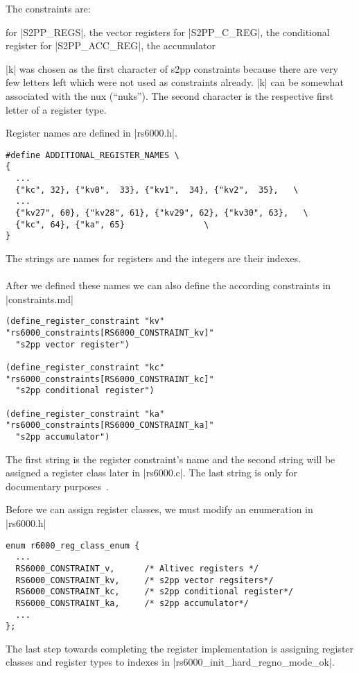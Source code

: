 The constraints are:
\begin{description}
         for |S2PP_REGS|, the vector registers
         for |S2PP_C_REG|, the conditional register
         for |S2PP_ACC_REG|, the accumulator
\end{description}

|k| was chosen as the first character of s2pp constraints because there are very few letters left which were not used as constraints already.
|k| can be somewhat associated with the nux (``nuks'').
The second character is the respective first letter of a register type.

Register names are defined in |rs6000.h|.
\begin{lstlisting}
#define ADDITIONAL_REGISTER_NAMES \
{
  ...
  {"kc", 32}, {"kv0",  33}, {"kv1",  34}, {"kv2",  35},   \
  ...
  {"kv27", 60}, {"kv28", 61}, {"kv29", 62}, {"kv30", 63},   \
  {"kc", 64}, {"ka", 65}                \
}
\end{lstlisting}
The strings are names for registers and the integers are their indexes.
\\
\\
After we defined these names we can also define the according constraints in |constraints.md|
\begin{lstlisting}
(define_register_constraint "kv" "rs6000_constraints[RS6000_CONSTRAINT_kv]"
  "s2pp vector register")

(define_register_constraint "kc" "rs6000_constraints[RS6000_CONSTRAINT_kc]"
  "s2pp conditional register")

(define_register_constraint "ka" "rs6000_constraints[RS6000_CONSTRAINT_ka]"
  "s2pp accumulator")
\end{lstlisting}

The first string is the register constraint's name and the second string will be assigned a register class later in |rs6000.c|.
The last string is only for documentary purposes~\citep[ch.~16.8]{GCCint}.

Before we can assign register classes, we must modify an enumeration in |rs6000.h|
\begin{lstlisting}
enum r6000_reg_class_enum {
  ...
  RS6000_CONSTRAINT_v,      /* Altivec registers */
  RS6000_CONSTRAINT_kv,     /* s2pp vector regsiters*/
  RS6000_CONSTRAINT_kc,     /* s2pp conditional register*/
  RS6000_CONSTRAINT_ka,     /* s2pp accumulator*/
  ...
};
\end{lstlisting}

The last step towards completing the register implementation is assigning register classes and register types to indexes in |rs6000_init_hard_regno_mode_ok|.

